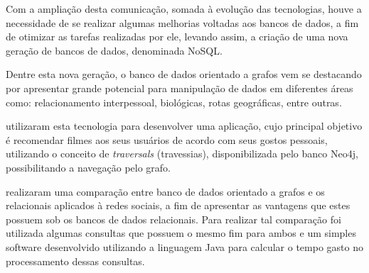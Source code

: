 \par %

\par %

\par Com a ampliação desta comunicação, somada à evolução das tecnologias, houve a necessidade de se realizar algumas melhorias voltadas aos bancos de dados, a fim de otimizar as tarefas realizadas por ele, levando assim, a criação de uma nova geração de bancos de dados, denominada NoSQL\footnotemark[1].


\par Dentre esta nova geração, o banco de dados orientado a grafos vem se destacando por apresentar grande potencial para manipulação de dados em diferentes áreas como: relacionamento interpessoal, biológicas, rotas geográficas, entre outras.

\par {} utilizaram esta tecnologia para desenvolver uma aplicação, cujo principal objetivo é recomendar filmes aos seus usuários de acordo com seus gostos pessoais, utilizando o conceito de \textit{traversals} (travessias), disponibilizada pelo banco Neo4j, possibilitando a navegação pelo grafo.

\par {} realizaram uma comparação entre banco de dados orientado a grafos e os relacionais aplicados à redes sociais, a fim de apresentar as vantagens que estes possuem sob os bancos de dados relacionais. Para realizar tal comparação foi utilizada algumas consultas que possuem o mesmo fim para ambos e um simples software desenvolvido utilizando a linguagem Java para calcular o tempo gasto no processamento dessas consultas.

